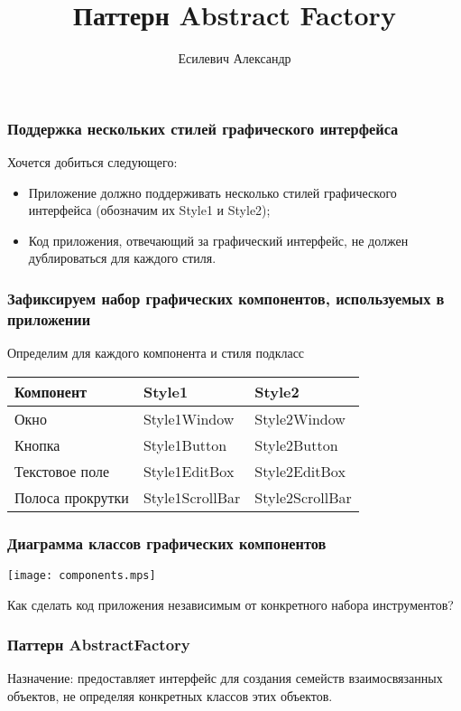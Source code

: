 \documentclass[handout]{beamer}
\title{Паттерн Abstract Factory}
\author{Есилевич Александр}
\begin{document}
\maketitle

\begin{frame}[fragile]
\frametitle{Поддержка нескольких стилей графического интерфейса}
Хочется добиться следующего:
\begin{itemize}
\item Приложение должно поддерживать несколько стилей графического интерфейса (обозначим их Style1 и Style2);
\item Код приложения, отвечающий за графический интерфейс, не должен дублироваться для каждого стиля.
\end{itemize}
\end{frame}


\begin{frame}[fragile]
\frametitle{Зафиксируем набор графических компонентов, используемых в приложении}
Определим для каждого компонента и стиля подкласс
\vspace{1cm}

\begin{tabular}{|l|l|l|}
\hline
Компонент		&	Style1					&	Style2 	\\
\hline
Окно			&	Style1Window		& 	Style2Window   	\\
Кнопка			&	Style1Button		&	Style2Button		\\
Текстовое поле	&	Style1EditBox		&	Style2EditBox		\\
Полоса прокрутки	&	Style1ScrollBar	&	Style2ScrollBar	\\
\hline
\end{tabular}
\end{frame}


\begin{frame}[fragile]
\frametitle{Диаграмма классов графических компонентов}
\begin{center}
\texttt{[image: components.mps]}
\end{center}
\end{frame}


\begin{frame}[fragile]
\begin{center}
Как сделать код приложения независимым от конкретного набора инструментов?
\end{center}
\end{frame}


\begin{frame}[fragile]
\frametitle{Паттерн AbstractFactory}
Назначение: предоставляет интерфейс для создания семейств взаимосвязанных объектов, не определяя конкретных классов
этих объектов.
\end{frame}
\end{document}
